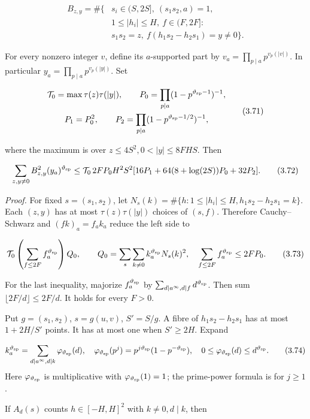 \[
\begin{aligned}
B_{z,y}=\#\{&s_i\in(S,2S],\ (s_1s_2,a)=1,\\
&1\le|h_i|\le H,\ f\in(F,2F]:\\
&s_1s_2=z,\ f(h_1s_2-h_2s_1)=y\ne0\}.
\end{aligned}
\tag{3.70}
\]

For every nonzero integer $v$, define its $a$-supported part by
$v_a=\prod_{p\mid a}p^{v_p(|v|)}$.
In particular $y_a=\prod_{p\mid a}p^{v_p(|y|)}$.
Set

\[
\begin{gathered}
\mathcal T_0=\max\tau(z)\tau(|y|),\qquad
P_0=\prod_{p\mid a}(1-p^{\vartheta_{\rm sp}-1})^{-1},\\
P_1=P_0^2,\qquad P_2=\prod_{p\mid a}(1-p^{\vartheta_{\rm sp}-1/2})^{-1},
\end{gathered}
\tag{3.71}
\]

where the maximum is over $z\le4S^2,0<|y|\le8FHS$.
Then

\[
\sum_{z,y\ne0}B_{z,y}^2(y_a)^{\vartheta_{\rm sp}}
 \le\mathcal T_0\,2FP_0H^2S^2
             [16P_1+64(8+\log(2S))P_0+32P_2].
\tag{3.72}
\]

\emph{Proof.} For fixed $s=(s_1,s_2)$, let
$N_s(k)=\#\{h:1\le|h_i|\le H,h_1s_2-h_2s_1=k\}$.
Each $(z,y)$ has at most $\tau(z)\tau(|y|)$ choices of $(s,f)$.
Therefore Cauchy--Schwarz and $(fk)_a=f_ak_a$ reduce the left side to

\[
\mathcal T_0\left(\sum_{f\le2F}f_a^{\vartheta_{\rm sp}}\right)Q_0,
\qquad Q_0=\sum_s\sum_{k\ne0}k_a^{\vartheta_{\rm sp}} N_s(k)^2,
\quad \sum_{f\le2F}f_a^{\vartheta_{\rm sp}}\le2FP_0.
\tag{3.73}
\]

For the last inequality, majorize $f_a^{\vartheta_{\rm sp}}$ by
$\sum_{d\mid a^\infty,d\mid f}d^{\vartheta_{\rm sp}}$.
Then sum $\lfloor2F/d\rfloor\le2F/d$. It holds for every $F>0$.

Put $g=(s_1,s_2)$, $s=g(u,v)$, $S'=S/g$.
A fibre of $h_1s_2-h_2s_1$ has at most $1+2H/S'$ points.
It has at most one when $S'\ge2H$. Expand

\[
k_a^{\vartheta_{\rm sp}}=\sum_{d\mid a^\infty,d\mid k}\varphi_{\vartheta_{\rm sp}}(d),
\quad\varphi_{\vartheta_{\rm sp}}(p^j)=p^{j\vartheta_{\rm sp}}(1-p^{-\vartheta_{\rm sp}}),
\quad0\le\varphi_{\vartheta_{\rm sp}}(d)\le d^{\vartheta_{\rm sp}}.
\tag{3.74}
\]
Here $\varphi_{\vartheta_{\rm sp}}$ is multiplicative with
$\varphi_{\vartheta_{\rm sp}}(1)=1$; the prime-power formula is for $j\ge1$.

If $A_d(s)$ counts $h\in[-H,H]^2$ with $k\ne0,d\mid k$, then

